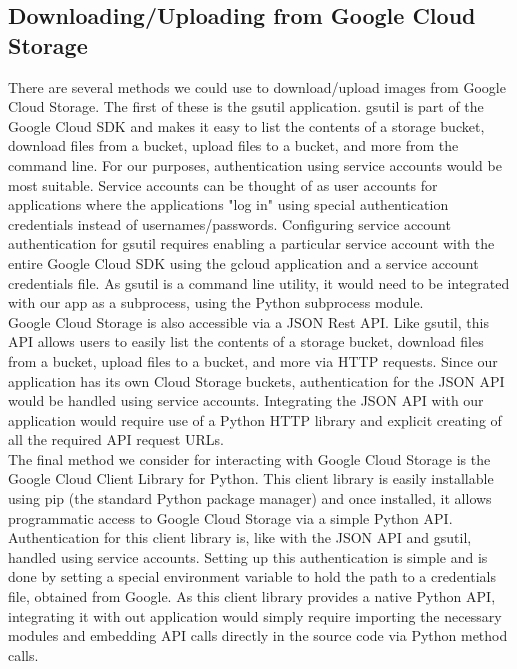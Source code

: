 \documentclass[10pt, onecolumn, draftclsnofoot, letterpaper, compsoc]{IEEEtran}
\begin{document}
\subsection{Downloading/Uploading from Google Cloud Storage}

There are several methods we could use to download/upload images from Google Cloud
Storage. The first of these is the gsutil application. gsutil is part of the Google
Cloud SDK and makes it easy to list the contents of a storage bucket, download files
from a bucket, upload files to a bucket, and more from the command 
line\cite{gsutil, cloudStorage}. For our purposes, authentication using
service accounts would be most suitable. Service accounts can be
thought of as user accounts for applications where the applications "log in"
using special authentication credentials instead of usernames/passwords. Configuring
service account authentication for gsutil requires enabling a particular service
account with the entire Google Cloud SDK using the gcloud application and a service
account credentials file. As gsutil is a command line utility, it would need to be
integrated with our app as a subprocess, using the Python subprocess module. \\

Google Cloud Storage is also accessible via a JSON Rest API. Like gsutil, this API 
allows users to easily list the contents of a storage bucket, download files from 
a bucket, upload files to a bucket, and more via HTTP requests\cite{cloudStorageJSON}.
Since our application has its own Cloud Storage buckets, authentication for the
JSON API would be handled using service accounts\cite{cloudStorageJSON}. Integrating 
the JSON API with our application would require use of a Python HTTP library and explicit creating
of all the required API request URLs\cite{cloudStorageJSON}. \\

The final method we consider for interacting with Google Cloud Storage is the
Google Cloud Client Library for Python. This client library is easily
installable using pip (the standard Python package manager) and once installed,
it allows programmatic access to Google Cloud Storage via a simple Python
API\cite{cloudStorageLib}. Authentication for this client library is, like with 
the JSON API and gsutil, handled using service accounts\cite{cloudStorageLib}. 
Setting up this authentication is simple and is done by setting a special 
environment variable to hold the path to a credentials file, obtained from 
Google\cite{cloudStorageLib}. As this client library provides a native Python 
API, integrating it with out application would simply require importing the 
necessary modules and embedding API calls directly in the source code via 
Python method calls\cite{cloudStorageLib}. \\
\end{document}
